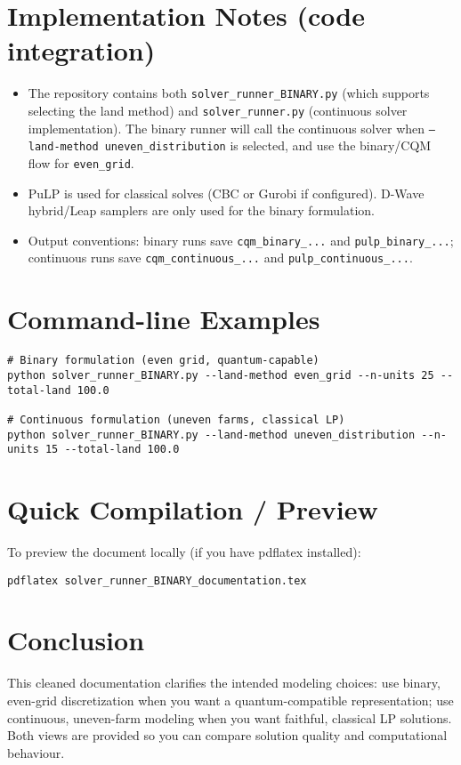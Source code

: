 \documentclass[11pt,a4paper]{article}
\begin{document}
\section{Implementation Notes (code integration)}
\begin{itemize}
    \item The repository contains both \texttt{solver\_runner\_BINARY.py} (which supports selecting the land method) and \texttt{solver\_runner.py} (continuous solver implementation). The binary runner will call the continuous solver when \texttt{--land-method uneven\_distribution} is selected, and use the binary/CQM flow for \texttt{even\_grid}.
    \item PuLP is used for classical solves (CBC or Gurobi if configured). D-Wave hybrid/Leap samplers are only used for the binary formulation.
    \item Output conventions: binary runs save \texttt{cqm\_binary\_...} and \texttt{pulp\_binary\_...}; continuous runs save \texttt{cqm\_continuous\_...} and \texttt{pulp\_continuous\_...}.
\end{itemize}

\section{Command-line Examples}
\begin{lstlisting}
# Binary formulation (even grid, quantum-capable)
python solver_runner_BINARY.py --land-method even_grid --n-units 25 --total-land 100.0

# Continuous formulation (uneven farms, classical LP)
python solver_runner_BINARY.py --land-method uneven_distribution --n-units 15 --total-land 100.0
\end{lstlisting}

\section{Quick Compilation / Preview}
To preview the document locally (if you have pdflatex installed):
\begin{verbatim}
pdflatex solver_runner_BINARY_documentation.tex
\end{verbatim}

\section{Conclusion}
This cleaned documentation clarifies the intended modeling choices: use binary, even-grid discretization when you want a quantum-compatible representation; use continuous, uneven-farm modeling when you want faithful, classical LP solutions. Both views are provided so you can compare solution quality and computational behaviour.
\end{document}
